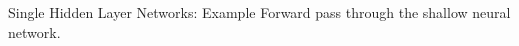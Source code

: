 \documentclass[11pt,compress,t,notes=noshow]{beamer}
\begin{document}

\begin{frame} {Single Hidden Layer Networks: Example}
\small{Forward pass through the shallow neural network.}
  \begin{figure}
    \centering

\end{figure}
\end{frame}
\end{document}
